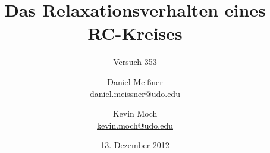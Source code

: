 


\newcommand{\name}[1]{\textsc{#1}}

\titlehead{{TU Dortmund \hfill WS~12/13\\}
Fakultät Physik\\
Experimentelle Übungen I}

\subject{Versuchsprotokoll}
\title{Das Relaxationsverhalten eines RC-Kreises}
\subtitle{Versuch 353}

\author{Daniel Meißner\\
{\normalsize\url{daniel.meissner@udo.edu}}
\and
Kevin Moch\\
{\normalsize\url{kevin.moch@udo.edu}}}

\date{13. Dezember 2012}


\maketitle

\tableofcontents
\clearpage










